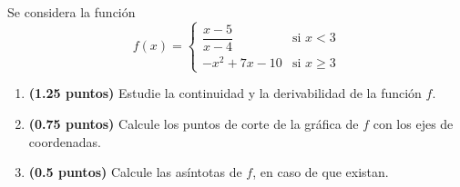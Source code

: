 
Se considera la función
\[
f(x)=\begin{cases}
\dfrac{x-5}{x-4} & \text{si }x<3\\[4pt]
-x^2+7x-10 & \text{si }x\geq3
\end{cases}
\]
\begin{enumerate}[label=\alph*)]
\item \textbf{(1.25 puntos)} Estudie la continuidad y la derivabilidad de la función $f$.
\item \textbf{(0.75 puntos)} Calcule los puntos de corte de la gráfica de $f$ con los ejes de coordenadas.
\item \textbf{(0.5 puntos)} Calcule las asíntotas de $f$, en caso de que existan.
\end{enumerate}
